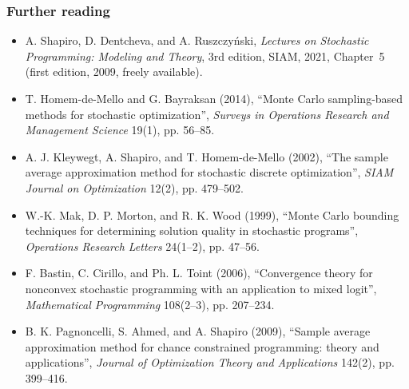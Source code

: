 \documentclass[aspectratio=169]{beamer}
\begin{document}
\begin{frame}
\frametitle{Further reading}
\footnotesize

\begin{itemize}
\item
A. Shapiro, D. Dentcheva, and A. Ruszczy\'nski, {\sl Lectures on Stochastic Programming: Modeling and Theory}, 3rd edition, SIAM, 2021, Chapter~5 (first edition, 2009, freely available).
\item
T. Homem-de-Mello and G. Bayraksan (2014), ``Monte Carlo sampling-based methods for stochastic optimization'', {\sl Surveys in Operations Research and Management Science} 19(1), pp. 56--85.
\item
A. J. Kleywegt, A. Shapiro, and T. Homem-de-Mello (2002), ``The sample average approximation method for stochastic discrete optimization'', {\sl SIAM Journal on Optimization} 12(2), pp. 479--502.
\item
W.-K. Mak, D. P. Morton, and R. K. Wood (1999), ``Monte Carlo bounding techniques for determining solution quality in stochastic programs'', {\sl Operations Research Letters} 24(1--2), pp. 47--56.
\item
F. Bastin, C. Cirillo, and Ph. L. Toint (2006), ``Convergence theory for nonconvex stochastic programming with an application to mixed logit'', {\sl Mathematical Programming} 108(2--3), pp. 207--234.
\item
B. K. Pagnoncelli, S. Ahmed, and A. Shapiro (2009), ``Sample average approximation method for chance constrained programming: theory and applications'', {\sl Journal of Optimization Theory and Applications} 142(2), pp. 399--416.
\end{itemize}

\end{frame}
\end{document}
